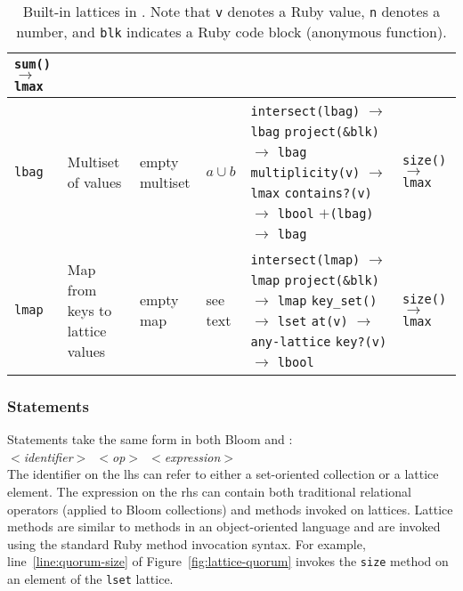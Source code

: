 \begin{table*}[t]
\begin{center}
\begin{tabular}{|l|p{0.88in}|l|l|p{1.44in}|p{1.00in}|}
\texttt{sum()} $\to$ \texttt{lmax} \\
\hline
\texttt{lbag} & Multiset of values & empty multiset & $a \cup b$ &
\texttt{intersect(lbag)} $\to$ \texttt{lbag}\newline
\texttt{project(\&blk)} $\to$ \texttt{lbag}\newline
\texttt{multiplicity(v)} $\to$ \texttt{lmax}\newline
\texttt{contains?(v)} $\to$ \texttt{lbool}\newline
\texttt{$\mathtt{+}$(lbag)} $\to$ \texttt{lbag}
& \texttt{size()} $\to$ \texttt{lmax}\\
\hline
\texttt{lmap} & Map from keys to \newline{}lattice values & empty map & see text&
\texttt{intersect(lmap)} $\to$ \texttt{lmap}\newline
\texttt{project(\&blk)} $\to$ \texttt{lmap}\newline
\texttt{key\_set()} $\to$ \texttt{lset}\newline
\texttt{at(v)} $\to$ \texttt{any-lattice}\newline
\texttt{key?(v)} $\to$ \texttt{lbool}
& \texttt{size()} $\to$ \texttt{lmax}\\
\hline
\end{tabular}
\caption{Built-in lattices in \lang. Note that \texttt{v} denotes a Ruby value,
  \texttt{n} denotes a number, and \texttt{blk} indicates a Ruby code block
  (anonymous function).}
\label{tbl:built-in-lattices}
\end{center}
\end{table*}

\subsubsection{Statements}
Statements take the same form in both Bloom and \lang: \\ \noindent
\mbox{\hspace{0.25in}\emph{$<$identifier$>$ $<$op$>$
    $<$expression$>$}}\\ \noindent
The identifier on the lhs can refer to either a set-oriented collection or a
lattice element. The expression on the rhs can contain both traditional
relational operators (applied to Bloom collections) and methods invoked on
lattices.  Lattice methods are similar to methods in an object-oriented language
and are invoked using the standard Ruby method invocation syntax. For example,
line~\ref{line:quorum-size} of Figure~\ref{fig:lattice-quorum} invokes the
\texttt{size} method on an element of the \texttt{lset} lattice.

